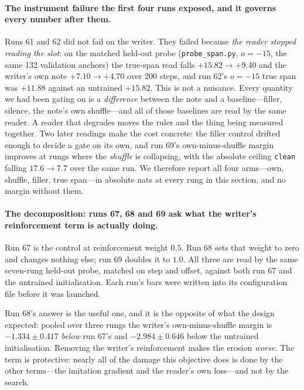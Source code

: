 \documentclass{article} %
\begin{document}
\paragraph{The instrument failure the first four runs exposed, and it governs every number after
them.} Runs 61 and 62 did not fail on the writer. They failed because \emph{the reader stopped
reading the slot}: on the matched held-out probe (\texttt{probe\_span.py}, $o = -15$, the same 132
validation anchors) the true-span read falls $+15.82 \to +9.40$ and the writer's own note
$+7.10 \to +4.70$ over 200 steps, and run 62's $o = -15$ true span was $+11.88$ against an untrained
$+15.82$. This is not a nuisance. Every quantity we had been gating on is a \emph{difference}
between the note and a baseline---filler, silence, the note's own shuffle---and all of those
baselines are read by the same reader. A reader that degrades moves the ruler and the thing being
measured together. Two later readings make the cost concrete: the filler control drifted enough to
decide a gate on its own, and run 69's own-minus-shuffle margin improves at rungs where the
\emph{shuffle} is collapsing, with the absolute ceiling \texttt{clean} falling $17.6 \to 7.7$ over
the same run. We therefore report all four arms---own, shuffle, filler, true span---in absolute nats
at every rung in this section, and no margin without them.

\paragraph{The decomposition: runs 67, 68 and 69 ask what the writer's reinforcement term is
actually doing.} Run 67 is the control at reinforcement weight $0.5$. Run 68 sets that weight to
zero and changes nothing else; run 69 doubles it to $1.0$. All three are read by the same
seven-rung held-out probe, matched on step and offset, against both run 67 and the untrained
initialisation. Each run's bars were written into its configuration file before it was launched.

Run 68's answer is the useful one, and it is the opposite of what the design expected: pooled over
three rungs the writer's own-minus-shuffle margin is $-1.334 \pm 0.417$ \emph{below} run 67's and
$-2.984 \pm 0.646$ below the untrained initialisation. Removing the writer's reinforcement makes the
erosion \emph{worse}. The term is protective: nearly all of the damage this objective does is done by
the other terms---the imitation gradient and the reader's own loss---and not by the search.
\end{document}

